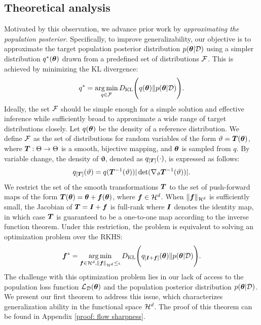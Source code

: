 \subsection{Theoretical analysis}

Motivated by this observation, we advance prior work by \textit{approximating the population posterior}. Specifically, to improve generalizability, our objective is to approximate the target population posterior distribution $p({\bm{\theta}} | {\mathcal{D}})$ using a simpler distribution $q^*({\bm{\theta}})$ drawn from a predefined set of distributions ${\mathcal{F}}$. This is achieved by minimizing the KL divergence:
\begin{equation}
    \label{eq: optimization problem}
    q^* = \operatorname*{arg\,min}_{q \in {\mathcal{F}}} D_{\mathrm{KL}}\Bigg(q({\bm{\theta}}) \| p({\bm{\theta}} | {\mathcal{D}})\Bigg).
\end{equation}
Ideally, the set ${\mathcal{F}}$ should be simple enough for a simple solution and effective inference while sufficiently broad to approximate a wide range of target distributions closely. Let $q({\bm{\theta}})$ be the density of a reference distribution. We define ${\mathcal{F}}$ as the set of distributions for random variables of the form $\mathbf{\vartheta} = {\bm{T}}({\bm{\theta}})$, where ${\bm{T}}: \Theta \to \Theta$ is a smooth, bijective mapping, and ${\bm{\theta}}$ is sampled from $q$. By variable change, the density of $\mathbf{\vartheta}$, denoted as $q_{[{\bm{T}}]}(\cdot)$, is expressed as follows:
\begin{equation*}
    q_{[{\bm{T}}]}(\mathbf{\vartheta}) = q({\bm{T}}^{-1}(\vartheta))|\det(\nabla_\mathbf{\vartheta} {\bm{T}}^{-1}(\mathbf{\vartheta}))|.
\end{equation*}
We restrict the set of the smooth transformations ${\bm{T}}$ to the set of push-forward maps of the form ${\bm{T}}({\bm{\theta}}) = {\bm{\theta}} + {\bm{f}}({\bm{\theta}})$, where ${\bm{f}} \in {\mathcal{H}}^d$. When $\|{\bm{f}}\|_{{\mathcal{H}}^d}$ is sufficiently small, the Jacobian of ${\bm{T}} = {\bm{I}} + {\bm{f}}$ is full-rank where ${\bm{I}}$ denotes the identity map, in which case ${\bm{T}}$ is guaranteed to be a one-to-one map according to the inverse function theorem. Under this restriction, the problem is equivalent to solving an optimization problem over the RKHS:
\begin{align*}
    {\bm{f}}^* = \operatorname*{arg\,min}_{{\bm{f}}\in{\mathcal{H}}^d, \|{\bm{f}}\|_{{\mathcal{H}}^d} \leq \epsilon} D_{\mathrm{KL}}\Bigg(q_{[{\bm{I}} + {\bm{f}}]}({\bm{\theta}})\|p({\bm{\theta}}|{\mathcal{D}})\Bigg).
\end{align*}
The challenge with this optimization problem lies in our lack of access to the population loss function ${\mathcal{L}}_{\mathcal{D}}({\bm{\theta}})$ and the population posterior distribution $p({\bm{\theta}} | {\mathcal{D}})$. We present our first theorem to address this issue, which characterizes generalization ability in the functional space ${\mathcal{H}}^d$. The proof of this theorem can be found in Appendix \ref{proof: flow sharpness}.
